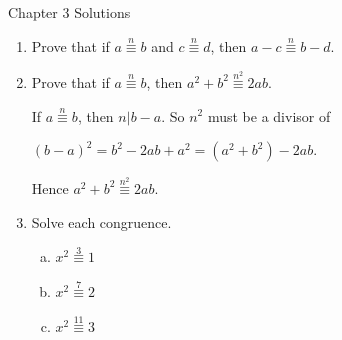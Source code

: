 \documentclass[11pt,fleqn,dvipsnames,usenames]{article}
\renewcommand{\headrulewidth}{1pt}
\begin{document}
\fancyhead[L]{\course}
\fancyhead[R]{\term}
\renewcommand{\headrulewidth}{0.4pt}

{\huge Chapter 3 Solutions}
\vsp

\begin{enumerate}
\item Prove that if $a\overset{n}{\equiv}b$ and $c\overset{n}{\equiv}d$, then $a-c\overset{n}{\equiv}b-d$.
\item Prove that if $a\overset{n}{\equiv}b$, then $a^2 + b^2\overset{n^2}{\equiv}2ab$.
\vsmsp

\solution If $a\overset{n}{\equiv}b$, then $n|b-a$.  So $n^2$ must be a divisor of
\begin{center}
$(b-a)^2 = b^2 - 2ab + a^2 = (a^2 + b^2) - 2ab$.
\end{center}
Hence $a^2 + b^2\overset{n^2}{\equiv}2ab$.
\item Solve each congruence.
\begin{multicols}{3}
\begin{enumerate}[(a)]
\item $x^2\overset{3}{\equiv}1$
\item $x^2\overset{7}{\equiv}2$
\item $x^2\overset{11}{\equiv}3$
\end{enumerate}
\end{multicols}
\vsmsp


\end{enumerate}
\end{document}
